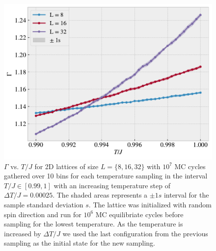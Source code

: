 \documentclass[reprint, amsmath, amssymb, aps, onecolumn]{revtex4-2}
\begin{document}
{{\begin{figure}[H]
  \centering
  \includegraphics[width=0.6\linewidth]{figures/fig2f.pdf}
  \caption{$\Gamma$ vs. $T/J$ for 2D lattices of size $L = \{8,16,32\}$ with $10^7$ MC cycles gathered over 10 bins for each temperature sampling in the interval $T/J \in [0.99, 1]$ with an increasing temperature step of $\Delta T/J = 0.00025$. The shaded areas represents a $\pm 1 s$ interval for the sample standard deviation $s$. The lattice was initialized with random spin direction and run for $10^6$ MC equilibriate cycles before sampling for the lowest temperature. As the temperature is increased by $\Delta T/J$ we used the last configuration from the previous sampling as the initial state for the new sampling.}
  \label{fig:fig2f}
\end{figure}

}}
\end{document}
